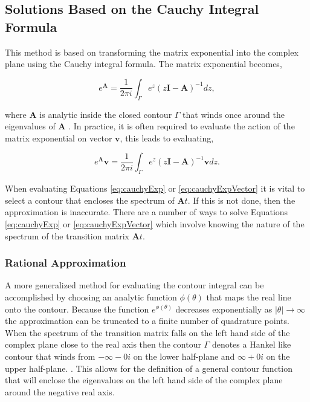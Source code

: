 \subsection{Solutions Based on the Cauchy Integral Formula}
This method is based on transforming the matrix exponential into the complex plane using the Cauchy integral formula.  The matrix exponential becomes,

\begin{equation}
	e^{\boldsymbol{A}} = \frac{1}{2\pi i}\int_{\Gamma} e^{z}(z\boldsymbol{I} - \boldsymbol{A})^{-1}dz,
	\label{eq:cauchyExp}
\end{equation}

\noindent where $\boldsymbol{A}$ is analytic inside the closed contour $\Gamma$ that winds once around the eigenvalues of $\boldsymbol{A}$ \cite{pusaThesis} \cite{pusa2011} \cite{Trefethen2006}. In practice, it is often required to evaluate the action of the matrix exponential on vector $\boldsymbol{v}$, this leads to evaluating,

\begin{equation}
	e^{\boldsymbol{A}}\boldsymbol{v} = \frac{1}{2\pi i}\int_{\Gamma} e^{z}(z\boldsymbol{I} - \boldsymbol{A})^{-1}\boldsymbol{v}dz.
	\label{eq:cauchyExpVector}
\end{equation}

\noindent When evaluating Equations \ref{eq:cauchyExp} or \ref{eq:cauchyExpVector} it is vital to select a contour that encloses the spectrum of $\boldsymbol{A}t$. If this is not done, then the approximation is inaccurate. There are a number of ways to solve Equations \ref{eq:cauchyExp} or \ref{eq:cauchyExpVector} which involve knowing the nature of the spectrum of the transition matrix $\boldsymbol{A}t$. 


\subsubsection{Rational Approximation}
A more generalized method for evaluating the contour integral can be accomplished by choosing an analytic function $\phi(\theta)$ that maps the real line onto the contour. Because the function $e^{\phi(\theta)}$ decreases exponentially as $|\theta| \rightarrow \infty$ the approximation can be truncated to a finite number of quadrature points. When the spectrum of the transition matrix falls on the left hand side of the complex plane close to the real axis then the contour $\Gamma$ denotes a Hankel like contour that winds from $-\infty-0i$ on the lower half-plane and $\infty+0i$ on the upper half-plane. \cite{Trefethen2006}. This allows for the definition of a general contour function that will enclose the eigenvalues on the left hand side of the complex plane around the negative real axis. 

